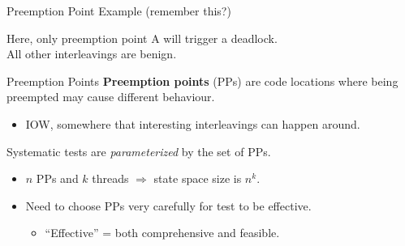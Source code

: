 \documentclass[xcolor=dvipsnames]{beamer}
\begin{document}
\begin{frame}{Preemption Point Example (remember this?)}
	\linegap

	Here, only preemption point A will trigger a deadlock. {\bf ~}\\
	All other interleavings are benign.{\bf ~}

\end{frame}

\begin{frame}{Preemption Points}
	\textbf{Preemption points} (PPs) are code locations where being preempted may cause different behaviour.
	\begin{itemize}
		\item IOW, somewhere that interesting interleavings can happen around.
	\end{itemize}
	\linegap

	Systematic tests are {\em parameterized} by the set of PPs.
	\begin{itemize}
		\item $n$ PPs and $k$ threads $\Rightarrow$ state space size is $n^k$.
		\item Need to choose PPs very carefully for test to be effective.
		\begin{itemize}
			\item ``Effective'' = both comprehensive and feasible.
		\end{itemize}
	\end{itemize}
\end{frame}
\end{document}
